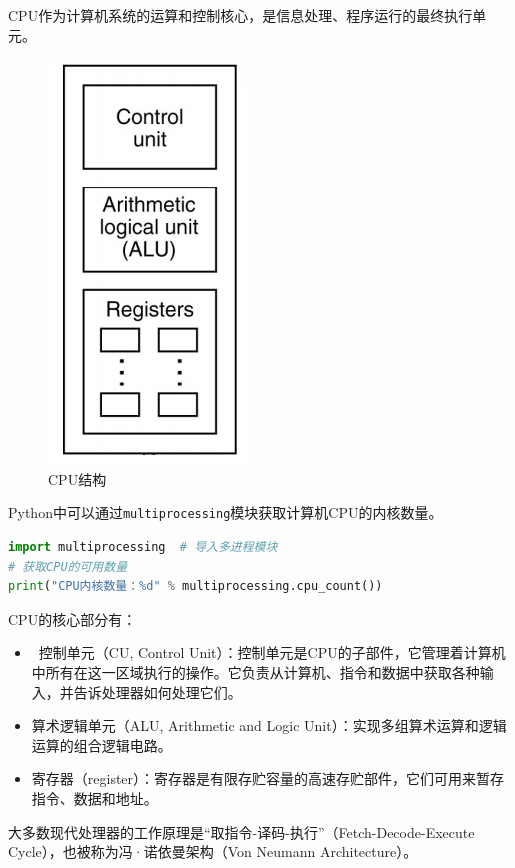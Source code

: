 CPU作为计算机系统的运算和控制核心，是信息处理、程序运行的最终执行单元。

\begin{figure}[H]
	\centering
	\includegraphics[scale=0.7]{img/C1/1-3/1.png}
	\caption{CPU结构}
\end{figure}

Python中可以通过\lstinline|multiprocessing|模块获取计算机CPU的内核数量。

\begin{lstlisting}[language=Python, title=获取CPU可用数量]
import multiprocessing	# 导入多进程模块
# 获取CPU的可用数量
print("CPU内核数量：%d" % multiprocessing.cpu_count())
\end{lstlisting}

CPU的核心部分有：

\begin{itemize}
	\item  控制单元（CU, Control Unit）：控制单元是CPU的子部件，它管理着计算机中所有在这一区域执行的操作。它负责从计算机、指令和数据中获取各种输入，并告诉处理器如何处理它们。

	\item 算术逻辑单元（ALU, Arithmetic and Logic Unit）：实现多组算术运算和逻辑运算的组合逻辑电路。

	\item 寄存器（register）：寄存器是有限存贮容量的高速存贮部件，它们可用来暂存指令、数据和地址。
\end{itemize}

大多数现代处理器的工作原理是“取指令-译码-执行”（Fetch-Decode-Execute Cycle），也被称为冯·诺依曼架构（Von Neumann Architecture）。

